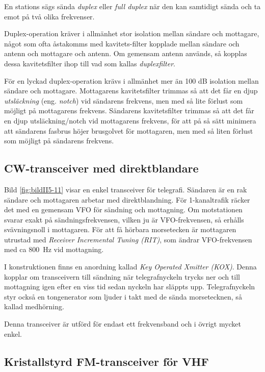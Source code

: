 En stations sägs sända \emph{duplex} eller \emph{full duplex} när den kan
samtidigt sända och ta emot på två olika frekvenser.

Duplex-operation kräver i allmänhet stor isolation mellan sändare och mottagare,
något som ofta åstakomms med kavitets-filter kopplade mellan sändare och antenn
och mottagare och antenn.
Om gemensam antenn används, så kopplas dessa kavitetsfilter ihop till vad som
kallas \emph{duplexfilter}.

För en lyckad duplex-operation krävs i allmänhet mer än 100 dB isolation mellan
sändare och mottagare.
Mottagarens kavitetsfilter trimmas så att det får en djup \emph{utsläckning}
(eng. \emph{notch}) vid sändarens frekvens, men med så lite förlust som möjligt
på mottagarens frekvens.
Sändarens kavitetsfilter trimmas så att det får en djup utsläckning/notch vid
mottagarens frekvens, för att på så sätt minimera att sändarens fasbrus höjer
brusgolvet för mottagaren, men med så liten förlust som möjligt på sändarens
frekvens.

\subsection{CW-transceiver med direktblandare}

Bild \ref{fig:bildII5-11} visar en enkel transceiver för telegrafi.
Sändaren är en rak sändare och mottagaren arbetar med direktblandning.
För 1-kanaltrafik räcker det med en gemensam VFO för sändning och mottagning.
Om motstationen svarar exakt på sändningsfrekvensen, vilken ju är
VFO-frekvensen, så erhålls svävningsnoll i mottagaren.
För att få hörbara morsetecken är mottagaren utrustad med
\emph{Receiver Incremental Tuning (RIT)}, som ändrar VFO-frekvensen med
ca 800~Hz vid mottagning.

I konstruktionen finns en anordning kallad \emph{Key Operated Xmitter (KOX)}.
Denna kopplar om transceivern till sändning när telegrafnyckeln trycks ner och
till mottagning igen efter en viss tid sedan nyckeln har släppts upp.
Telegrafnyckeln styr också en tongenerator som ljuder i takt med de sända
morsetecknen, så kallad medhörning.

Denna transceiver är utförd för endast ett frekvensband och i övrigt
mycket enkel.

\subsection{Kristallstyrd FM-transceiver för VHF}

